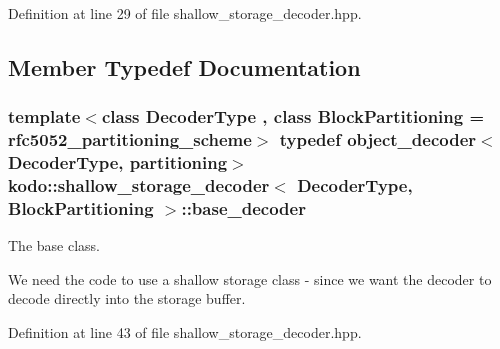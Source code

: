 Definition at line 29 of file shallow\-\_\-storage\-\_\-decoder.\-hpp.



\subsection{Member Typedef Documentation}
\hypertarget{classkodo_1_1shallow__storage__decoder_a0f36d9fb6c80894d613f0b86527d2198}{
\subsubsection[{base\-\_\-decoder}]{\setlength{\rightskip}{0pt plus 5cm}template$<$class Decoder\-Type , class Block\-Partitioning  = rfc5052\-\_\-partitioning\-\_\-scheme$>$ typedef {\bf object\-\_\-decoder}$<$Decoder\-Type, {\bf partitioning}$>$ {\bf kodo\-::shallow\-\_\-storage\-\_\-decoder}$<$ Decoder\-Type, Block\-Partitioning $>$\-::{\bf base\-\_\-decoder}}}\label{classkodo_1_1shallow__storage__decoder_a0f36d9fb6c80894d613f0b86527d2198}


The base class. 

We need the code to use a shallow storage class -\/ since we want the decoder to decode directly into the storage buffer. 

Definition at line 43 of file shallow\-\_\-storage\-\_\-decoder.\-hpp.



